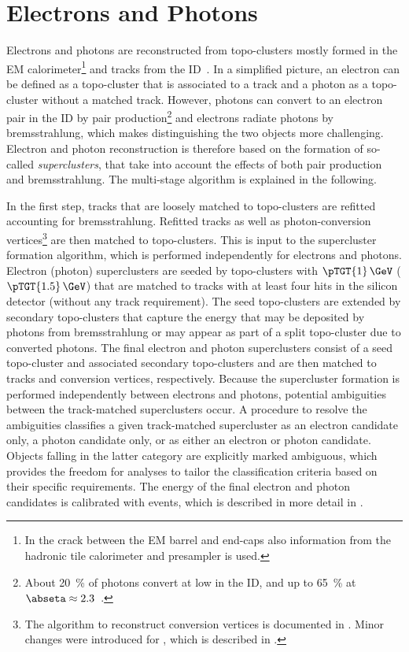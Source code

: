 \section{Electrons and Photons}
\label{sec:electron-photon-reconstruction}
Electrons and photons are reconstructed from topo-clusters mostly formed in the EM calorimeter\footnote{In the crack between the EM barrel and end-caps also information from the hadronic tile calorimeter and presampler is used.} and tracks from the ID~\cite{EGAM-2018-01}.
In a simplified picture, an electron can be defined as a topo-cluster that is associated to a track and a photon as a topo-cluster without a matched track.
However, photons can convert to an electron pair in the ID by pair production\footnote{About \SI{20}{\percent} of photons convert at low \abseta in the ID, and up to \SI{65}{\percent} at $\abseta \approx 2.3$~\cite{EGAM-2018-01}.} and electrons radiate photons by bremsstrahlung, which makes distinguishing the two objects more challenging. Electron and photon reconstruction is therefore based on the formation of so-called \emph{superclusters}, that take into account the effects of both pair production and bremsstrahlung. The multi-stage algorithm is explained in the following.

In the first step, tracks that are loosely matched to topo-clusters are refitted accounting for bremsstrahlung. Refitted tracks as well as photon-conversion vertices\footnote{The algorithm to reconstruct conversion vertices is documented in . Minor changes were introduced for \RunTwo, which is described in .} are then matched to topo-clusters.
This is input to the supercluster formation algorithm, which is performed independently for electrons and photons.
Electron (photon) superclusters are seeded by topo-clusters with $\pTGT{1}\,\GeV$ ($\pTGT{1.5}\,\GeV$) that are matched to tracks with at least four hits in the silicon detector (without any track requirement).
The seed topo-clusters are extended by secondary topo-clusters that capture the energy that may be deposited by photons from bremsstrahlung or may appear as part of a split topo-cluster due to converted photons.
The final electron and photon superclusters consist of a seed topo-cluster and associated secondary topo-clusters and are then matched to tracks and conversion vertices, respectively.
Because the supercluster formation is performed independently between electrons and photons, potential ambiguities between the track-matched superclusters occur. A procedure to resolve the ambiguities classifies a given track-matched supercluster as an electron candidate only, a photon candidate only, or as either an electron or photon candidate.
Objects falling in the latter category are explicitly marked ambiguous, which provides the freedom for analyses to tailor the classification criteria based on their specific requirements.
The energy of the final electron and photon candidates is calibrated with \Zee events, which is described in more detail in .

